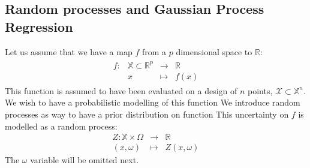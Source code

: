 \documentclass[a4paper,11pt]{article}
\theoremstyle{defi}
\numberwithin{thmCounter}{section}
\begin{document}
\subsection{Random processes and Gaussian Process Regression}
Let us assume that we have a map $f$ from a $p$ dimensional space to $\mathbb{R}$:
\begin{align}
  \begin{array}{rrcl}
    f: & \mathbb{X} \subset \mathbb{R}^p& \longrightarrow & \mathbb{R} \\
       & x & \longmapsto & f(x)
  \end{array}
\end{align}
This function is assumed to have been evaluated on a design of $n$ points, $\mathcal{X} \subset \mathbb{X}^n$. 
We wish to have a probabilistic modelling of this function
We introduce random processes as way to have a prior distribution on function
This uncertainty on $f$ is modelled as a random process:
\begin{equation}
  \begin{array}{rcl}
    Z: \mathbb{X} \times \Omega& \longrightarrow & \mathbb{R} \\
    (x,\omega) & \longmapsto & Z(x,\omega)
  \end{array}
\end{equation}
The $\omega$ variable will be omitted next.
\end{document}
